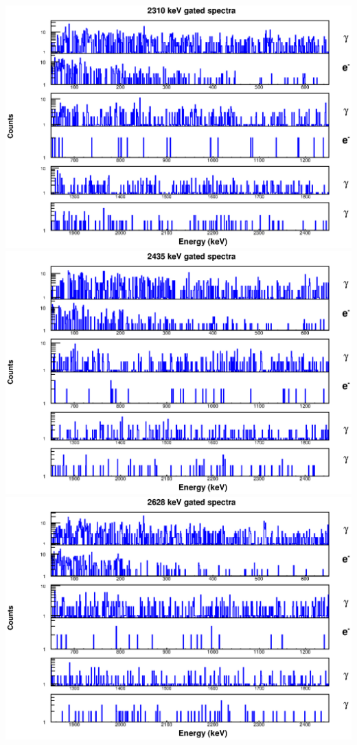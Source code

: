 \includegraphics[scale=0.8]{154Gd_Appendix/2310_combined.eps}
\includegraphics[scale=0.8]{154Gd_Appendix/2435_combined.eps}
\includegraphics[scale=0.8]{154Gd_Appendix/2628_combined.eps}
